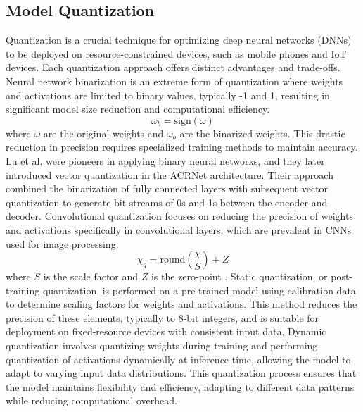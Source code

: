 \documentclass[lettersize,journal]{IEEEtran}
\begin{document}
\subsection{Model Quantization}
Quantization is a crucial technique for optimizing deep neural networks (DNNs) to be deployed on resource-constrained devices, such as mobile phones and IoT devices. Each quantization approach offers distinct advantages and trade-offs. Neural network binarization is an extreme form of quantization where weights and activations are limited to binary values, typically -1 and 1, resulting in significant model size reduction and computational efficiency. 
\begin{equation}
	\omega_{b}=\mathrm{sign}(\omega)
\end{equation}
where \begin{math}
	\omega
\end{math}
are the original weights and \begin{math} \omega_{b}\end{math} are the binarized weights. This drastic reduction in precision requires specialized training methods to maintain accuracy. \cite{aaa1} Lu et al. \cite{abp} were pioneers in applying binary neural networks, and they later introduced vector quantization in the ACRNet\cite{abx} architecture. Their approach combined the binarization of fully connected layers with subsequent vector quantization to generate bit streams of 0s and 1s between the encoder and decoder. Convolutional quantization focuses on reducing the precision of weights and activations specifically in convolutional layers, which are prevalent in CNNs used for image processing. 
\begin{equation}
	\chi_{q}=\mathrm{round}(\frac{\chi}{S})+Z
\end{equation}
where \begin{math}
	S
\end{math} is the scale factor and \begin{math}
Z
\end{math} is the zero-point \cite{convolutionalquantization}. 
Static quantization, or post-training quantization, is performed on a pre-trained model using calibration data to determine scaling factors for weights and activations. This method reduces the precision of these elements, typically to 8-bit integers, and is suitable for deployment on fixed-resource devices with consistent input data\cite{staticquantization}.
Dynamic quantization involves quantizing weights during training and performing quantization of activations dynamically at inference time, allowing the model to adapt to varying input data distributions. This quantization process ensures that the model maintains flexibility and efficiency, adapting to different data patterns while reducing computational overhead. \cite{dynamicquantization}
\end{document}
